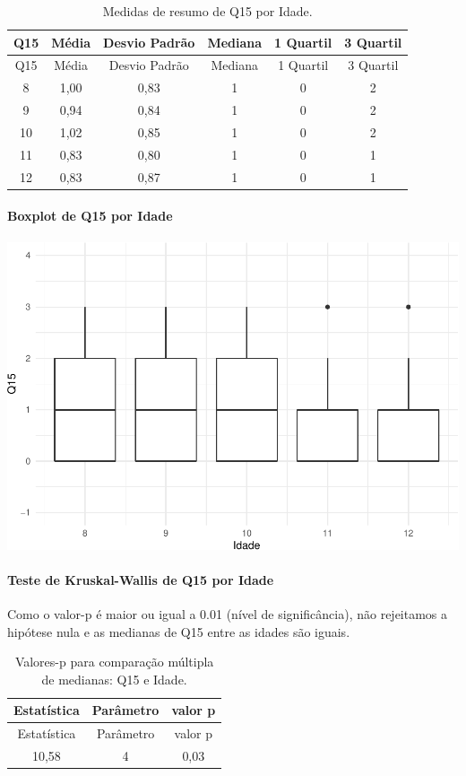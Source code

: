 \documentclass[]{article}
\let\oldparagraph\paragraph
\renewcommand{\paragraph}[1]{\oldparagraph{#1}\mbox{}}
\begin{document}
\begin{longtable}[]{@{}cccccc@{}}
\caption{\label{tab:unnamed-chunk-96}Medidas de resumo de Q15 por Idade.}\tabularnewline
\toprule
Q15 & Média & Desvio Padrão & Mediana & 1 Quartil & 3 Quartil\tabularnewline
\midrule
\endfirsthead
\toprule
Q15 & Média & Desvio Padrão & Mediana & 1 Quartil & 3 Quartil\tabularnewline
\midrule
\endhead
8 & 1,00 & 0,83 & 1 & 0 & 2\tabularnewline
9 & 0,94 & 0,84 & 1 & 0 & 2\tabularnewline
10 & 1,02 & 0,85 & 1 & 0 & 2\tabularnewline
11 & 0,83 & 0,80 & 1 & 0 & 1\tabularnewline
12 & 0,83 & 0,87 & 1 & 0 & 1\tabularnewline
\bottomrule
\end{longtable}

\hypertarget{boxplot-de-q15-por-idade}{%
\paragraph{Boxplot de Q15 por Idade}\label{boxplot-de-q15-por-idade}}

\begin{center}\includegraphics[width=0.75\linewidth]{relatorio_covid19_files/figure-latex/unnamed-chunk-97-1} \end{center}

\hypertarget{teste-de-kruskal-wallis-de-q15-por-idade}{%
\paragraph{Teste de Kruskal-Wallis de Q15 por Idade}\label{teste-de-kruskal-wallis-de-q15-por-idade}}

Como o valor-p é maior ou igual a 0.01 (nível de significância), não rejeitamos a hipótese nula e as medianas de Q15 entre as idades são iguais.

\begin{longtable}[]{@{}ccc@{}}
\caption{\label{tab:unnamed-chunk-99}Valores-p para comparação múltipla de medianas: Q15 e Idade.}\tabularnewline
\toprule
Estatística & Parâmetro & valor p\tabularnewline
\midrule
\endfirsthead
\toprule
Estatística & Parâmetro & valor p\tabularnewline
\midrule
\endhead
10,58 & 4 & 0,03\tabularnewline
\bottomrule
\end{longtable}
\end{document}
